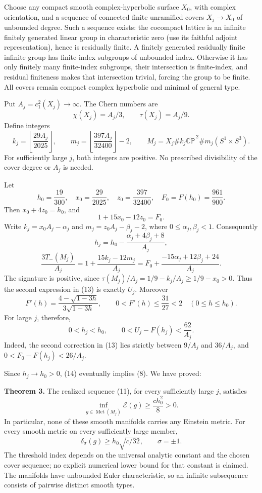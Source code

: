 \documentclass[
  11pt,
]{article}
\begin{document}
Choose any compact smooth complex-hyperbolic surface \(X_0\), with
complex orientation, and a sequence of connected finite unramified
covers \(X_j\to X_0\) of unbounded degree. Such a sequence exists: the
cocompact lattice is an infinite finitely generated linear group in
characteristic zero (use its faithful adjoint representation), hence is
residually finite. A finitely generated residually finite infinite group
has finite-index subgroups of unbounded index. Otherwise it has only
finitely many finite-index subgroups, their intersection is
finite-index, and residual finiteness makes that intersection trivial,
forcing the group to be finite. All covers remain compact complex
hyperbolic and minimal of general type.

Put \(A_j=c_1^2(X_j)\to\infty\). The Chern numbers are \[
 \chi(X_j)=A_j/3,\qquad \tau(X_j)=A_j/9.
\] Define integers \[
 k_j=\left\lfloor\frac{29 A_j}{2025}\right\rfloor,
 \qquad
 m_j=\left\lfloor\frac{397 A_j}{32400}\right\rfloor-2,
 \qquad
 M_j=X_j\#k_j\overline{\mathbb{CP}}^{\,2}
          \#m_j(S^1\times S^3).
 \tag{11}
\] For sufficiently large \(j\), both integers are positive. No
prescribed divisibility of the cover degree or \(A_j\) is needed.

Let \[
 h_0=\frac{19}{300},\quad x_0=\frac{29}{2025},\quad
 z_0=\frac{397}{32400},\quad F_0=F(h_0)=\frac{961}{900}.
\] Then \(x_0+4z_0=h_0\), and \[
 1+15x_0-12z_0=F_0.
 \tag{12}
\] Write \(k_j=x_0A_j-\alpha_j\) and \(m_j=z_0A_j-\beta_j-2\), where
\(0\le\alpha_j,\beta_j<1\). Consequently \[
 h_j=h_0-\frac{\alpha_j+4\beta_j+8}{A_j},
\] \[
 \frac{3T_-(M_j)}{A_j}
 =1+\frac{15k_j-12m_j}{A_j}
 =F_0+\frac{-15\alpha_j+12\beta_j+24}{A_j}.
 \tag{13}
\] The signature is positive, since
\(\tau(M_j)/A_j=1/9-k_j/A_j\ge1/9-x_0>0\). Thus the second expression in
(13) is exactly \(U_j\). Moreover \[
 F'(h)=\frac{4-\sqrt{1-3h}}{3\sqrt{1-3h}},
 \qquad 0<F'(h)\le\frac{31}{27}<2
 \quad(0\le h\le h_0).
\] For large \(j\), therefore, \[
 0<h_j<h_0,\qquad
 \boxed{0<U_j-F(h_j)<\frac{62}{A_j}.}
 \tag{14}
\] Indeed, the second correction in (13) lies strictly between \(9/A_j\)
and \(36/A_j\), and \(0<F_0-F(h_j)<26/A_j\).

Since \(h_j\to h_0>0\), (14) eventually implies (8). We have proved:

\textbf{Theorem 3.} The realized sequence (11), for every sufficiently
large \(j\), satisfies \[
 \boxed{\inf_{g\in\operatorname{Met}(M_j)}\mathcal E(g)
       \ge\frac{c h_0^2}{8}>0.}
 \tag{15}
\] In particular, none of these smooth manifolds carries any Einstein
metric. For every smooth metric on every sufficiently large member, \[
 \delta_\sigma(g)\ge h_0\sqrt{c/32},\qquad \sigma=\pm1.
 \tag{16}
\] The threshold index depends on the universal analytic constant and
the chosen cover sequence; no explicit numerical lower bound for that
constant is claimed. The manifolds have unbounded Euler characteristic,
so an infinite subsequence consists of pairwise distinct smooth types.
\end{document}
